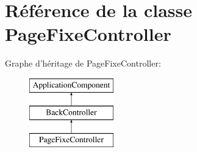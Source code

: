 \hypertarget{class_applications_1_1_backend_1_1_modules_1_1_page_fixe_1_1_page_fixe_controller}{\section{Référence de la classe Page\+Fixe\+Controller}
\label{class_applications_1_1_backend_1_1_modules_1_1_page_fixe_1_1_page_fixe_controller}
}
Graphe d'héritage de Page\+Fixe\+Controller\+:\begin{figure}[H]
\begin{center}
\leavevmode
\includegraphics[height=3.000000cm]{class_applications_1_1_backend_1_1_modules_1_1_page_fixe_1_1_page_fixe_controller}
\end{center}
\end{figure}
